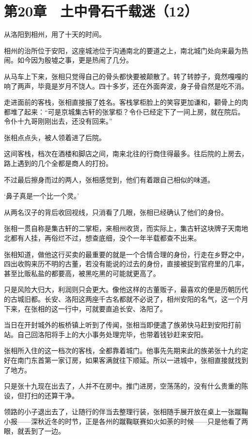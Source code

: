 \section{第20章　土中骨石千载迷（12）}

从洛阳到相州，用了十天的时间。

相州的治所位于安阳，这座城池位于沟通南北的要道之上，南北城门处向来最为热闹。如今因为殷墟之事，更是热闹了几分。

从马车上下来，张相只觉得自己的骨头都快要被颠散了。转了转脖子，竟然嘎嘎的响了两声，毕竟是岁月不饶人。四十多岁，还在外面奔波，身子骨自然是吃不消。

走进面前的客栈，张相直接报了姓名。客栈掌柜脸上的笑容更加谦和，颧骨上的肉都堆了起来：“可是京城集古轩的张掌柜？令仆已经定下了一间上房，就在院后。令仆十九哥刚刚出去，还没有回来。”

张相点点头，被人领着进了后院。

这间客栈，档次在酒楼和脚店之间，南来北往的行商住得最多。往后院的上房去，路上遇到的几个全都是商人的打扮。

不过最后擦身而过的两人，张相感觉到，他们有着跟自己相似的味道。

‘鼻子真是一个比一个灵。’

从两名汉子的背后收回视线，只消看了几眼，张相已经确认了他们的身份。

张相一贯自称是集古轩的二掌柜，来相州收货，而实际上，集古轩这块牌子天南地北都有人挂，再俗烂不过，想查底细，没个一年半载都查不出来。

张相知道，做他这行买卖的最重要的就是一个合情合理的身份，行走在乡野之中，四出收购来历不明的古董，若没有能说的过去的身份，直接被捉到官府里的几率，甚至比贩私盐的都要高，被黑吃黑的可能就更高了。

只是风险大归大，利润则只会更大。像他这样的古董贩子，最喜欢的便是历朝历代的古城旧都。长安、洛阳这两座千古名都就不必说了，相州安阳的名气，这一个月下来，在张相的这一行中，可就要直追长安、洛阳了。

当日在开封城外的板桥镇上听到了传闻，张相当即便遣了族弟快马赶到安阳打前站。自己回洛阳将手上的大小事务处理完毕，也带着钱钞赶来安阳。

张相所入住的这一档次的客栈，全都靠着城门。他事先先期来此的族弟张十九约定好在南门东首第一家订房，如果客满就往下顺延。所以一进城中，张相直接就找到了地方。

只是张十九现在出去了，人并不在房中。推门进房，空荡荡的，没有什么贵重的陈设，但打扫的还算干净。

领路的小子退出去了，让随行的伴当去整理行装，张相随手展开放在桌上一张蹴鞠小报——深秋近冬的时节，正是各州的蹴鞠联赛如火如荼的时候——只是他看了两眼，就丢到了一边。

